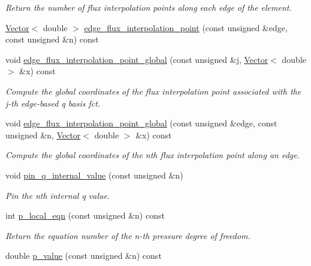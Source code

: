 \begin{DoxyCompactItemize}
\begin{DoxyCompactList}\small\item\em Return the number of flux interpolation points along each edge of the element. \end{DoxyCompactList}\item 
\hyperlink{classoomph_1_1Vector}{Vector}$<$ double $>$ \hyperlink{classoomph_1_1TRaviartThomasDarcyElement_adde4a19355d0a4142c462d2271e5cbcf}{edge\+\_\+flux\+\_\+interpolation\+\_\+point} (const unsigned \&edge, const unsigned \&n) const
\item 
void \hyperlink{classoomph_1_1TRaviartThomasDarcyElement_a11c49e611acc0becbf0907766b5e9938}{edge\+\_\+flux\+\_\+interpolation\+\_\+point\+\_\+global} (const unsigned \&j, \hyperlink{classoomph_1_1Vector}{Vector}$<$ double $>$ \&x) const
\begin{DoxyCompactList}\small\item\em Compute the global coordinates of the flux interpolation point associated with the j-\/th edge-\/based q basis fct. \end{DoxyCompactList}\item 
void \hyperlink{classoomph_1_1TRaviartThomasDarcyElement_a39394c7bd6d9517135f2befcd5e7d646}{edge\+\_\+flux\+\_\+interpolation\+\_\+point\+\_\+global} (const unsigned \&edge, const unsigned \&n, \hyperlink{classoomph_1_1Vector}{Vector}$<$ double $>$ \&x) const
\begin{DoxyCompactList}\small\item\em Compute the global coordinates of the nth flux interpolation point along an edge. \end{DoxyCompactList}\item 
void \hyperlink{classoomph_1_1TRaviartThomasDarcyElement_a26fd22715cc5a27e55bca5d760b822e0}{pin\+\_\+q\+\_\+internal\+\_\+value} (const unsigned \&n)
\begin{DoxyCompactList}\small\item\em Pin the nth internal q value. \end{DoxyCompactList}\item 
int \hyperlink{classoomph_1_1TRaviartThomasDarcyElement_a2ecb4c8ab08c0a21dbbf3afbf1101fbf}{p\+\_\+local\+\_\+eqn} (const unsigned \&n) const
\begin{DoxyCompactList}\small\item\em Return the equation number of the n-\/th pressure degree of freedom. \end{DoxyCompactList}\item 
double \hyperlink{classoomph_1_1TRaviartThomasDarcyElement_a4d1ad5a3473c1d8e4b477bedf5cb88d5}{p\+\_\+value} (const unsigned \&n) const

\end{DoxyCompactItemize}
